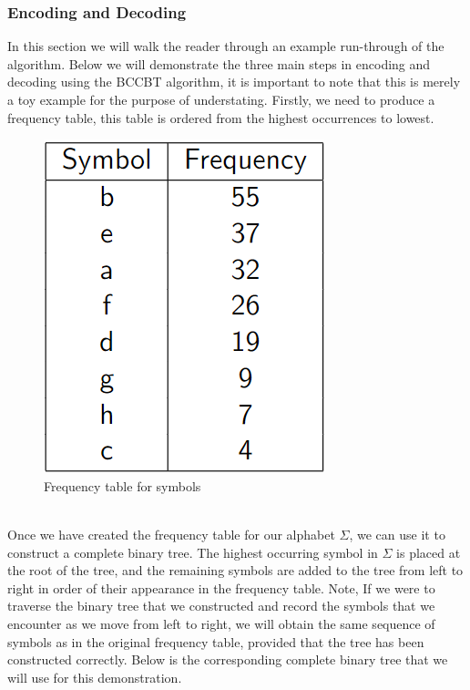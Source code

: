 \documentclass[12pt]{IEEEtran}
\begin{document}
\subsubsection{Encoding and Decoding}
In this section we will walk the reader through an example run-through of the algorithm.
Below we will demonstrate the three main steps in encoding and decoding using the BCCBT algorithm, it is important
to note that this is merely a toy example for the purpose of understating.\newline
Firstly, we need to produce a frequency table, this table is ordered from the highest occurrences to lowest.
\begin{figure}[h]
    \centering
    \includegraphics[scale=0.35]{../presentation/images/freqtbl.png}
    \captionsetup{justification=centering}
    \caption{Frequency table for symbols}
\end{figure}
\\
Once we have created the frequency table for our alphabet $\Sigma$, we can use it to construct a complete binary tree. 
The highest occurring symbol in $\Sigma$ is placed at the root of the tree, and the remaining symbols are added to the 
tree from left to right in order of their appearance in the frequency table. Note, If we were to traverse the binary tree that we constructed 
and record the symbols that we encounter as we move from left to right, we will obtain the same sequence of symbols as in the original 
frequency table, provided that the tree has been constructed correctly. Below is the corresponding complete binary tree that we will use 
for this demonstration.
\end{document}
